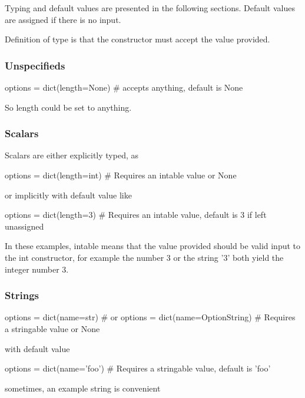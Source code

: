 Typing and default values are presented in the following sections.
Default values are assigned if there is no input.

Definition of type is that the constructor must accept the value
provided.


\subsubsection{Unspecifieds}
\begin{python}
  options = dict(length=None)
  # accepts anything, default is None
\end{python}
So length could be set to anything.



\subsubsection*{Scalars}
Scalars are either explicitly typed, as

\begin{python}
  options = dict(length=int)
  # Requires an intable value or None
\end{python}
or implicitly with default value like

\begin{python}
  options = dict(length=3)
  # Requires an intable value, default is 3 if left unassigned
\end{python}
In these examples, intable means that the value provided should be
valid input to the int constructor, for example the number 3 or the
string '3' both yield the integer number 3.



\subsubsection*{Strings}
\begin{python}
  options = dict(name=str)           # or
  options = dict(name=OptionString)
  # Requires a stringable value or None
\end{python}
with default value

\begin{python}
  options = dict(name='foo')
  # Requires a stringable value, default is 'foo'
\end{python}
sometimes, an example string is convenient


